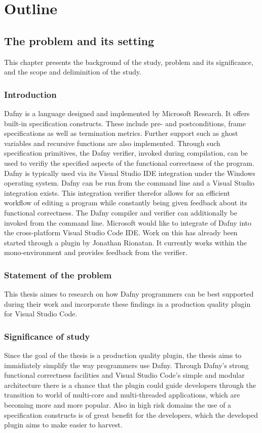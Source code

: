 \section{Outline}
\subsection{The problem and its setting}
This chapter presents the background of the study, problem and its significance, and the scope and deliminition of the study.
\subsubsection{Introduction}
Dafny is a language designed and implemented by Microsoft Research. It offers built-in specification constructs. These include pre- and postconditions, frame specifications as well as termination metrics. Further support such as ghost variables and recursive functions are also implemented. Through such specification primitives, the Dafny verifier, invoked during compilation, can be used to verifiy the specified aspects of the functional correctness of the program. \newline
Dafny is typically used via its Visual Studio IDE integration under the Windows operating system. Dafny can be run from the command line and a Visual Studio integration exists. This integration verifier therefor allows for an efficient workflow of editing a program while constantly being given feedback about its functional correctness. The Dafny compiler and verifier can additionally be invoked from the command line. \newline
Microsoft would like to integrate of Dafny into the cross-platform Visual Studio Code IDE. Work on this has already been started through a plugin by Jonathan  Rionatan. It currently works within the mono-environment and provides feedback from the verifier. \newline

\subsubsection{Statement of the problem}
This thesis aimes to research on how Dafny programmers can be best supported during their work and incorporate these findings in a production quality plugin for Visual Studio Code. 
\subsubsection{Significance of study}
Since the goal of the thesis is a production quality plugin, the thesis aims to immidiately simplify the way programmers use Dafny. Through Dafny's strong functional correctness facilities and Visual Studio Code's simple and modular architecture there is a chance that the plugin could guide developers through the transition to world of multi-core and multi-threaded applications, which are becoming more and more popular. Also in high risk domains the use of a specification constructs is of great benefit for the developers, which the developed plugin aims to make easier to harvest.
